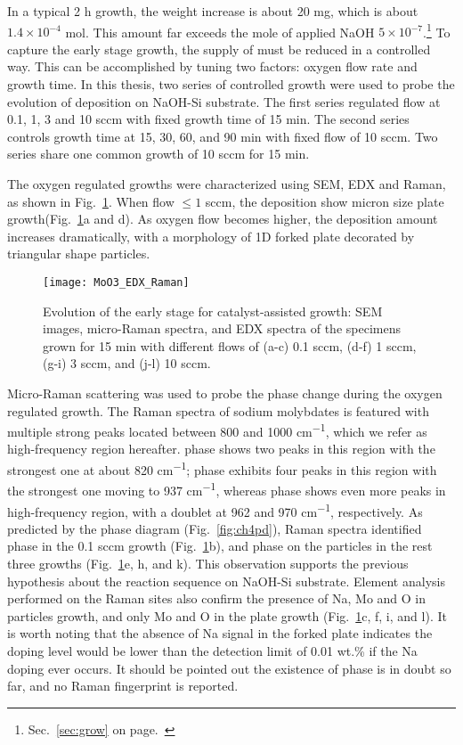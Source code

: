 In a typical 2 h growth, the  weight increase is about 20 mg, which is about $1.4\times 10^{-4}$ mol. This amount far exceeds the mole of applied NaOH $5\times 10^{-7}$.\footnote{Sec.~\ref{sec:grow} on page.~\pageref{sec:grow}} To capture the early stage growth, the supply of  must be reduced in a controlled way. This can be accomplished by tuning two factors: oxygen flow rate and growth time. In this thesis, two series of controlled growth were used to probe the evolution of  deposition on NaOH-Si substrate. The first series regulated  flow at 0.1, 1, 3 and 10 sccm with fixed growth time of 15 min. The second series controls growth time at 15, 30, 60, and 90 min with fixed  flow of 10 sccm. Two series share one common growth of 10 sccm  for 15 min. 

The oxygen regulated growths were characterized using SEM, EDX and Raman, as shown in Fig.~\ref{fig:ch4oxy}. When  flow $\leq 1$ sccm, the deposition show micron size plate growth(Fig.~\ref{fig:ch4oxy}a and d). As oxygen flow becomes higher, the deposition amount increases dramatically, with a morphology of 1D forked plate decorated by triangular shape particles.
\begin{figure}[htb]
\centering
\texttt{[image: MoO3\_EDX\_Raman]}
\caption[Growth evolution of : first stage]{Evolution of the early stage for catalyst-assisted  growth: SEM images, micro-Raman spectra, and EDX spectra of the specimens grown for 15 min with different  flows of (a-c) 0.1 sccm, (d-f) 1 sccm, (g-i) 3 sccm, and (j-l) 10 sccm. }
\label{fig:ch4oxy}
\end{figure}

Micro-Raman scattering was used to probe the phase change during the oxygen regulated growth. The Raman spectra of sodium molybdates is featured with multiple strong peaks located between 800 and 1000 \si{cm^{-1}}, which we refer as high-frequency region hereafter.  phase shows two peaks in this region with the strongest one at about 820 \si{cm^{-1}};  phase exhibits four peaks in this region with the strongest one moving to 937 \si{cm^{-1}}, whereas  phase shows even more peaks in high-frequency region, with a doublet at 962 and 970 \si{cm^{-1}}, respectively.\cite{Schofield2005,Saraiva2011} As predicted by the phase diagram (Fig.~\ref{fig:ch4pd}), Raman spectra identified  phase in the 0.1 sccm growth (Fig.~\ref{fig:ch4oxy}b), and  phase on the particles in the rest three growths (Fig.~\ref{fig:ch4oxy}e, h, and k). This observation supports the previous hypothesis about the reaction sequence on NaOH-Si substrate. Element analysis performed on the Raman sites also confirm the presence of Na, Mo and O in particles growth, and only Mo and O in the plate growth (Fig.~\ref{fig:ch4oxy}c, f, i, and l). It is worth noting that the absence of Na signal in the forked  plate indicates the doping level would be lower than the detection limit of 0.01 wt.\% if the Na doping ever occurs. It should be pointed out the existence of  phase is in doubt so far, and no Raman fingerprint is reported.\cite{Fomichev1992}  

